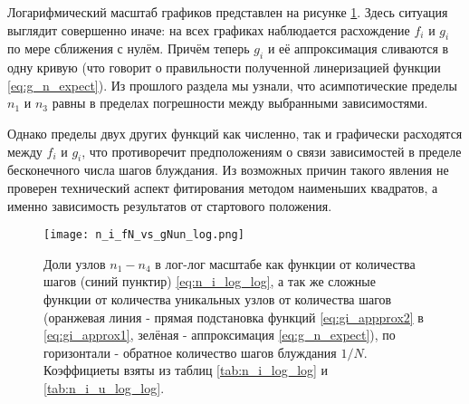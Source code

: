 Логарифмический масштаб графиков представлен на рисунке \ref{fig:ni_fn_vs_gNun_log}. 
Здесь ситуация выглядит совершенно иначе: на всех графиках наблюдается расхождение $f_i$ и $g_i$ по мере сближения с нулём.
Причём теперь $g_i$ и её аппроксимация сливаются в одну кривую (что говорит о правильности полученной линеризацией функции \eqref{eq:g_n_expect}). 
Из прошлого раздела мы узнали, что асимпотические пределы $n_1$ и $n_3$ равны в пределах погрешности между выбранными зависимостями.

Однако пределы двух других функций как численно, так и графически расходятся между $f_i$ и $g_i$, что противоречит предположениям о связи зависимостей в пределе бесконечного числа шагов блуждания.
Из возможных причин такого явления не проверен технический аспект фитирования методом наименьших квадратов, а именно зависимость результатов от стартового положения.


\begin{figure}
\centering
\texttt{[image: n\_i\_fN\_vs\_gNun\_log.png]}
\label{fig:ni_fn_vs_gNun_log}
\caption{Доли узлов $n_1-n_4$ в лог-лог масштабе как функции от количества шагов (синий пунктир) \eqref{eq:n_i_log_log}, а так же сложные функции от количества уникальных узлов от количества шагов (оранжевая линия - прямая подстановка функций  \eqref{eq:gi_appprox2} в \eqref{eq:gi_approx1}, зелёная - аппроксимация \eqref{eq:g_n_expect}), по горизонтали - обратное количество шагов блуждания $1/N$. Коэффициеты взяты из таблиц \ref{tab:n_i_log_log} и \ref{tab:n_i_u_log_log}.}
\end{figure}